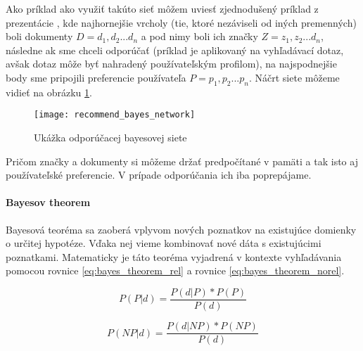 Ako príklad ako využiť takúto sieť môžem uviesť zjednodušený príklad z
prezentácie \cite{probability_ir}, kde najhornejšie vrcholy (tie, ktoré nezáviseli od iných 
premenných) boli dokumenty \(D = {d_1, d_2 ... d_n}\) a pod nimy
boli ich značky \(Z = {z_1, z_2... d_n}\), následne ak sme chceli odporúčať (príklad je 
aplikovaný na vyhľadávací dotaz, avšak dotaz môže byť nahradený používateľským profilom),
na najspodnejšie body sme pripojili preferencie používateľa \(P = {p_1, p_2... p_n}\).
Náčrt siete môžeme vidieť na obrázku \ref{fig:recommend_bayes_network}.

\begin{figure}
    \begin{center}
        \texttt{[image: recommend\_bayes\_network]}
        \caption{Ukážka odporúčacej bayesovej siete}
        \label{fig:recommend_bayes_network}
    \end{center}
\end{figure}

Pričom značky a dokumenty si môžeme držať predpočítané v pamäti a tak isto aj používateľské 
preferencie. V prípade odporúčania ich iba poprepájame.

\paragraph{Bayesov theorem}

Bayesová teoréma sa zaoberá vplyvom nových poznatkov na existujúce 
domienky o určitej hypotéze. Vďaka nej vieme kombinovať nové dáta s existujúcimi poznatkami.
Matematicky je táto teoréma vyjadrená v kontexte vyhľadávania 
pomocou rovnice \ref{eq:bayes_theorem_rel} a rovnice \ref{eq:bayes_theorem_norel}.

\begin{equation} \label{eq:bayes_theorem_rel}
P(P|d) = \frac{P(d|P) * P(P)}{P(d)}
\end{equation}

\begin{equation} \label{eq:bayes_theorem_norel}
P(NP|d) = \frac{P(d|NP) * P(NP)}{P(d)}
\end{equation}

